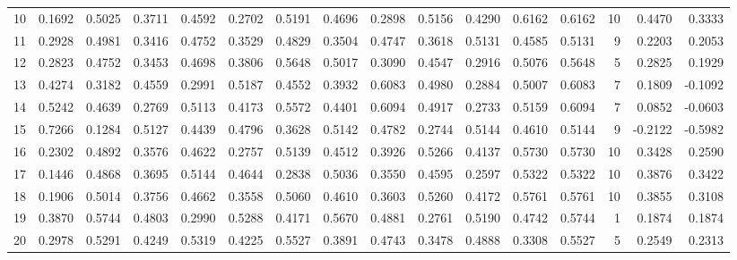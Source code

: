\begin{tabular}{lrrrrrrrrrrrrrrr}
10  &      0.1692 &  0.5025 &  0.3711 &  0.4592 &  0.2702 &  0.5191 &  0.4696 &  0.2898 &  0.5156 &  0.4290 &   0.6162 &     0.6162 &     10 &                    0.4470 &                     0.3333 \\
11  &      0.2928 &  0.4981 &  0.3416 &  0.4752 &  0.3529 &  0.4829 &  0.3504 &  0.4747 &  0.3618 &  0.5131 &   0.4585 &     0.5131 &      9 &                    0.2203 &                     0.2053 \\
12  &      0.2823 &  0.4752 &  0.3453 &  0.4698 &  0.3806 &  0.5648 &  0.5017 &  0.3090 &  0.4547 &  0.2916 &   0.5076 &     0.5648 &      5 &                    0.2825 &                     0.1929 \\
13  &      0.4274 &  0.3182 &  0.4559 &  0.2991 &  0.5187 &  0.4552 &  0.3932 &  0.6083 &  0.4980 &  0.2884 &   0.5007 &     0.6083 &      7 &                    0.1809 &                    -0.1092 \\
14  &      0.5242 &  0.4639 &  0.2769 &  0.5113 &  0.4173 &  0.5572 &  0.4401 &  0.6094 &  0.4917 &  0.2733 &   0.5159 &     0.6094 &      7 &                    0.0852 &                    -0.0603 \\
15  &      0.7266 &  0.1284 &  0.5127 &  0.4439 &  0.4796 &  0.3628 &  0.5142 &  0.4782 &  0.2744 &  0.5144 &   0.4610 &     0.5144 &      9 &                   -0.2122 &                    -0.5982 \\
16  &      0.2302 &  0.4892 &  0.3576 &  0.4622 &  0.2757 &  0.5139 &  0.4512 &  0.3926 &  0.5266 &  0.4137 &   0.5730 &     0.5730 &     10 &                    0.3428 &                     0.2590 \\
17  &      0.1446 &  0.4868 &  0.3695 &  0.5144 &  0.4644 &  0.2838 &  0.5036 &  0.3550 &  0.4595 &  0.2597 &   0.5322 &     0.5322 &     10 &                    0.3876 &                     0.3422 \\
18  &      0.1906 &  0.5014 &  0.3756 &  0.4662 &  0.3558 &  0.5060 &  0.4610 &  0.3603 &  0.5260 &  0.4172 &   0.5761 &     0.5761 &     10 &                    0.3855 &                     0.3108 \\
19  &      0.3870 &  0.5744 &  0.4803 &  0.2990 &  0.5288 &  0.4171 &  0.5670 &  0.4881 &  0.2761 &  0.5190 &   0.4742 &     0.5744 &      1 &                    0.1874 &                     0.1874 \\
20  &      0.2978 &  0.5291 &  0.4249 &  0.5319 &  0.4225 &  0.5527 &  0.3891 &  0.4743 &  0.3478 &  0.4888 &   0.3308 &     0.5527 &      5 &                    0.2549 &                     0.2313 \\

\end{tabular}

